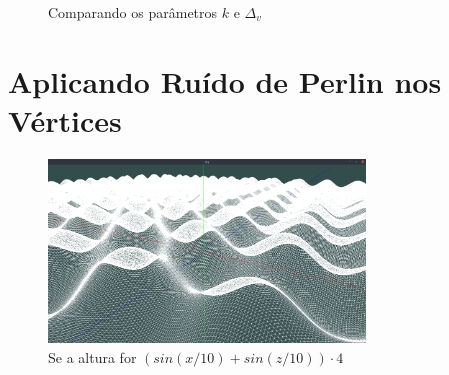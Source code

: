 \begin{figure}[H]
     \centering
     \hspace{0.1cm}
     \hspace{0.1cm}
     \caption{Comparando os parâmetros $k$ e $\Delta_{v}$}
     \label{fig:parametrosGrid}
\end{figure}


\section{Aplicando Ruído de Perlin nos Vértices}


\begin{figure}[H]
    \centering
    \includegraphics[width=0.75\textwidth]{figuras/sssins.png}
    \caption{Se a altura for $(sin(x/10) + sin(z/10)) \cdot 4$}
    \label{fig:sssins}
\end{figure}

